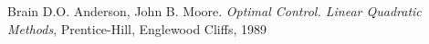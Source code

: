\begin{thebibliography}{ABCD}

Brain D.O. Anderson, John B. Moore. \emph{Optimal Control. Linear Quadratic Methods}, Prentice-Hill, Englewood Cliffs, 1989

\end{thebibliography}